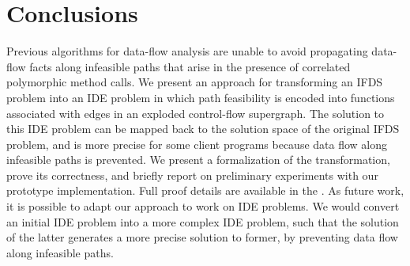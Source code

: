 \section{Conclusions}
  \label{sec:Conclusions}
  
Previous algorithms for data-flow analysis are unable to avoid propagating
data-flow facts along infeasible paths that arise in the presence of
correlated polymorphic method calls. 
% 
We present an approach for transforming an IFDS problem into an IDE problem
in which path feasibility is encoded into functions associated
with edges in an exploded control-flow supergraph. The solution to this
IDE problem can be mapped back to the solution space of the original IFDS
problem, and is more precise for some client programs because data flow along
infeasible paths is prevented. We present a formalization of the
transformation, prove its correctness, and briefly report on
preliminary experiments with our prototype implementation. Full proof
details are available in the \reportOrAppendix.
%  
As future work, it is possible to adapt our approach to work on IDE
problems. We would convert an initial IDE problem into a more complex IDE problem, 
such that the solution of the latter generates a more precise
solution to former, by preventing data flow along infeasible paths.
